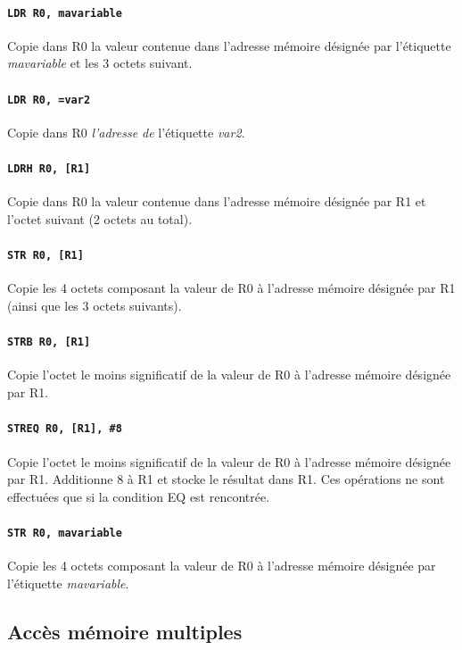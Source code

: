 \documentclass{tufte-handout}
\begin{document}
\paragraph{\texttt{LDR R0, mavariable}} Copie dans R0 la valeur contenue dans l'adresse mémoire désignée par l'étiquette \textit{mavariable} et les 3 octets suivant.

\paragraph{\texttt{LDR R0, =var2}} Copie dans R0 \textit{l'adresse de} l'étiquette \textit{var2}.

\paragraph{\texttt{LDRH R0, [R1]}} Copie dans R0 la valeur contenue dans l'adresse mémoire désignée par R1 et l'octet suivant (2 octets au total).

\paragraph{\texttt{STR R0, [R1]}} Copie les 4 octets composant la valeur de R0 à l'adresse mémoire désignée par R1 (ainsi que les 3 octets suivants).

\paragraph{\texttt{STRB R0, [R1]}} Copie l'octet le moins significatif de la valeur de R0 à l'adresse mémoire désignée par R1.

\paragraph{\texttt{STREQ R0, [R1], \#8}} Copie l'octet le moins significatif de la valeur de R0 à l'adresse mémoire désignée par R1. Additionne 8 à R1 et stocke le résultat dans R1. Ces opérations ne sont effectuées que si la condition EQ est rencontrée.

\paragraph{\texttt{STR R0, mavariable}} Copie les 4 octets composant la valeur de R0 à l'adresse mémoire désignée par l'étiquette \textit{mavariable}.


\subsection{Accès mémoire multiples}
\end{document}
